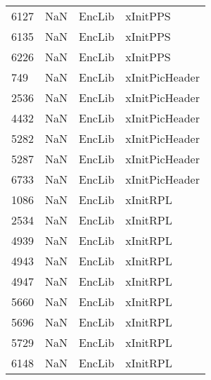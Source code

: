 \begin{tabular}{llll}
6127 &                   NaN &                     EncLib &                                  xInitPPS \\
6135 &                   NaN &                     EncLib &                                  xInitPPS \\
6226 &                   NaN &                     EncLib &                                  xInitPPS \\
749  &                   NaN &                     EncLib &                            xInitPicHeader \\
2536 &                   NaN &                     EncLib &                            xInitPicHeader \\
4432 &                   NaN &                     EncLib &                            xInitPicHeader \\
5282 &                   NaN &                     EncLib &                            xInitPicHeader \\
5287 &                   NaN &                     EncLib &                            xInitPicHeader \\
6733 &                   NaN &                     EncLib &                            xInitPicHeader \\
1086 &                   NaN &                     EncLib &                                  xInitRPL \\
2534 &                   NaN &                     EncLib &                                  xInitRPL \\
4939 &                   NaN &                     EncLib &                                  xInitRPL \\
4943 &                   NaN &                     EncLib &                                  xInitRPL \\
4947 &                   NaN &                     EncLib &                                  xInitRPL \\
5660 &                   NaN &                     EncLib &                                  xInitRPL \\
5696 &                   NaN &                     EncLib &                                  xInitRPL \\
5729 &                   NaN &                     EncLib &                                  xInitRPL \\
6148 &                   NaN &                     EncLib &                                  xInitRPL \\

\end{tabular}
